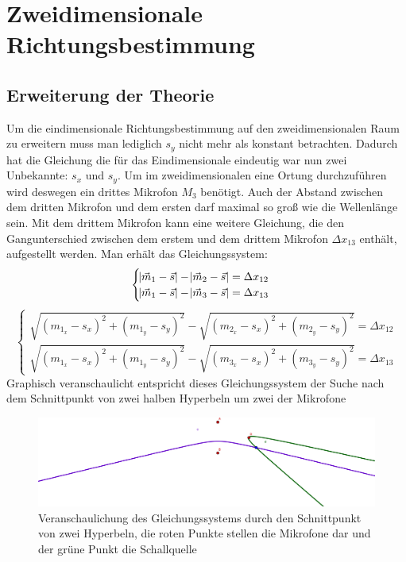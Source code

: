 \section{Zweidimensionale Richtungsbestimmung} 
\subsection{Erweiterung der Theorie}
Um die eindimensionale Richtungsbestimmung auf den zweidimensionalen Raum zu erweitern muss man lediglich $s_y$ nicht mehr als konstant betrachten. Dadurch hat die Gleichung die für das Eindimensionale eindeutig war nun zwei Unbekannte: $s_x$ und $s_y$. Um im zweidimensionalen eine Ortung durchzuführen wird deswegen ein drittes Mikrofon $M_3$ benötigt. Auch der Abstand zwischen dem dritten Mikrofon und dem ersten darf maximal so groß wie die Wellenlänge sein. Mit dem drittem Mikrofon kann eine weitere Gleichung, die den Gangunterschied zwischen dem erstem und dem drittem Mikrofon $\Delta{x_{13}}$ enthält, aufgestellt werden. Man erhält das Gleichungssystem:
$$\begin{cases}
  \abs{\vec{m}_1 - \vec{s}} - \abs{\vec{m}_2 - \vec{s}} = \Delta{x_{12}} \\
  \abs{\vec{m}_1 - \vec{s}} - \abs{\vec{m}_3 - \vec{s}} = \Delta{x_{13}}
\end{cases}$$
$$\begin{cases}
  \sqrt{{(m_{1_x} - s_x)}^2 + {(m_{1_y} - s_y)}^2} - \sqrt{{(m_{2_x} - s_x)}^2 + {(m_{2_y} - s_y)}^2} = \Delta{x_{12}} \\
  \sqrt{{(m_{1_x} - s_x)}^2 + {(m_{1_y} - s_y)}^2} - \sqrt{{(m_{3_x} - s_x)}^2 + {(m_{3_y} - s_y)}^2} = \Delta{x_{13}}
\end{cases}$$
Graphisch veranschaulicht entspricht dieses Gleichungssystem der Suche nach dem Schnittpunkt von zwei halben Hyperbeln um zwei der Mikrofone
\begin{figure}[H]
  \includegraphics[width=\linewidth]{img/geogebra}
  \caption{Veranschaulichung des Gleichungssystems durch den Schnittpunkt von zwei Hyperbeln, die roten Punkte stellen die Mikrofone dar und der grüne Punkt die Schallquelle}
\end{figure}

